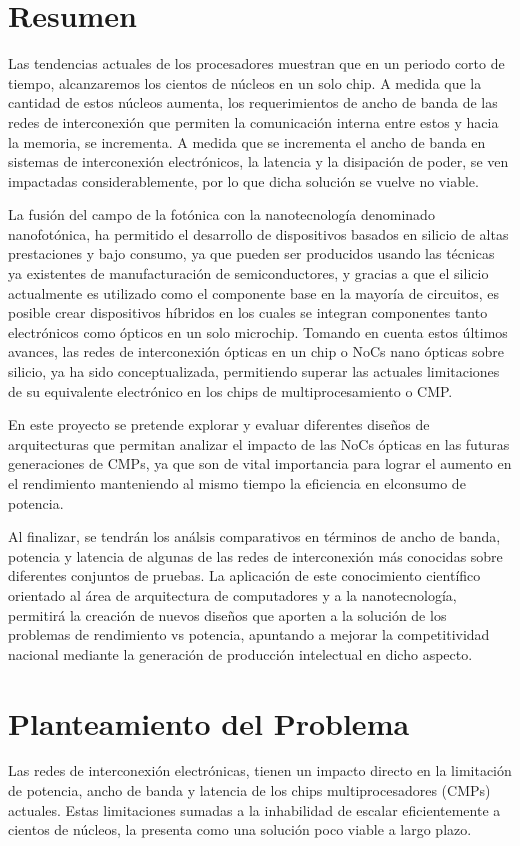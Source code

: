 \section{Resumen}
Las tendencias actuales de los procesadores muestran que en un periodo corto de tiempo, 
alcanzaremos los cientos de núcleos en un solo chip. 
A medida que la cantidad de estos núcleos aumenta, los requerimientos de ancho de banda 
de las redes de interconexión que permiten la comunicación interna entre estos y 
hacia la memoria, se incrementa. A medida que se incrementa el ancho de banda en 
sistemas de interconexión electrónicos, la latencia y la disipación de poder, 
se ven impactadas considerablemente, por lo que dicha solución se vuelve no viable.

La fusión del campo de la fotónica con la nanotecnología denominado 
nanofotónica, ha permitido el desarrollo de dispositivos
basados en silicio de altas prestaciones y bajo consumo, ya que pueden 
ser producidos usando las técnicas ya existentes de manufacturación de semiconductores, 
y gracias a que el silicio actualmente es utilizado como el componente base 
en la mayoría de circuitos, es posible crear dispositivos híbridos en los cuales 
se integran componentes tanto electrónicos como ópticos en un solo microchip. 
Tomando en cuenta estos últimos avances, las redes de interconexión ópticas 
en un chip o NoCs nano ópticas sobre silicio, ya ha sido conceptualizada, 
permitiendo superar las actuales limitaciones de su equivalente electrónico 
en los chips de multiprocesamiento o CMP.

En este proyecto se pretende explorar y evaluar diferentes diseños de 
arquitecturas que permitan analizar el impacto de las NoCs ópticas en 
las futuras generaciones de CMPs, ya que son de vital importancia para 
lograr el aumento en el rendimiento manteniendo al mismo tiempo la eficiencia 
en elconsumo de potencia.

Al finalizar, se tendrán los análsis comparativos en términos de ancho de banda, 
potencia y latencia de algunas de las redes de interconexión más conocidas 
sobre diferentes conjuntos de pruebas. La aplicación de este conocimiento 
científico orientado al área de arquitectura de computadores y a la nanotecnología, 
permitirá la creación de nuevos diseños que aporten a la solución de los
problemas de rendimiento vs potencia, apuntando a mejorar la competitividad 
nacional mediante la generación de producción intelectual en dicho aspecto.

\section{Planteamiento del Problema}
Las redes de interconexión electrónicas, tienen un impacto directo en 
la limitación de potencia, ancho de banda y latencia de los
chips multiprocesadores (CMPs) actuales. 
Estas limitaciones sumadas a la inhabilidad de escalar eficientemente a cientos de
núcleos, la presenta como una solución poco viable a largo plazo.


